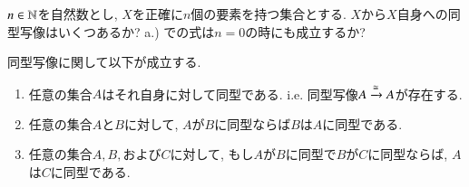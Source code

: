 \begin{exercise}

$n\in{\mathbb N}$を自然数とし, $X$を正確に$n$個の要素を持つ集合とする.
\sexc $X$から$X$自身への同型写像はいくつあるか? 
\next a.) での式は$n=0$の時にも成立するか?
\endsexc
\end{exercise}

\begin{lemma}\label{lemma:isomorphic ER in Set}


同型写像に関して以下が成立する.
\begin{enumerate}
\item 任意の集合$A$はそれ自身に対して同型である. i.e. 同型写像$A\xrightarrow{\cong} A$が存在する.
\item 任意の集合$A$と$B$に対して, $A$が$B$に同型ならば$B$は$A$に同型である.
\item 任意の集合$A, B,$および$C$に対して, もし$A$が$B$に同型で$B$が$C$に同型ならば, $A$は$C$に同型である.
\end{enumerate}

\end{lemma}

